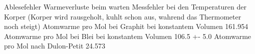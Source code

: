 Ablesefehler
Warmeverluste beim warten
Messfehler bei den Temperaturen der Korper (Korper wird rausgeholt, kuhlt schon aus, wahrend das Thermometer noch steigt)
Atomwarme pro Mol bei Graphit bei konstantem Volumen 161.954
Atomwarme pro Mol bei Blei bei konstantem Volumen 106.5 +-  5.0
Atomwarme pro Mol nach Dulon-Petit 24.573
